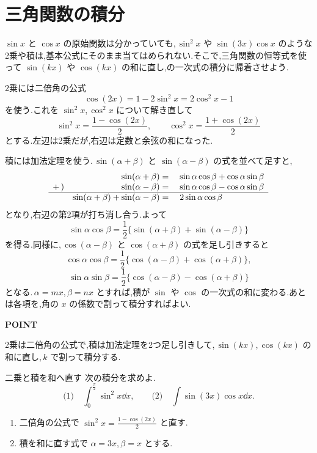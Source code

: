 \section{三角関数の積分}\label{節:三角式の整理}

$\sin x$ と $\cos x$ の原始関数は分かっていても,\,$\sin^2x$ や $\sin(3x)\cos x$ のような2乗や積は,基本公式にそのまま当てはめられない.そこで,三角関数の恒等式を使って $\sin(kx)$ や $\cos(kx)$ の和に直し,の一次式の積分に帰着させよう.

2乗には二倍角の公式
\[
 \cos(2x)=1-2\sin^2x=2\cos^2x-1
\]
を使う.これを $\sin^2x$,\,$\cos^2x$ について解き直して
\[
 \sin^2x=\frac{1-\cos(2x)}2,\qquad
 \cos^2x=\frac{1+\cos(2x)}2
\]
とする.左辺は2乗だが,右辺は定数と余弦の和になった.

積には加法定理を使う.\,$\sin(\alpha+\beta)$ と $\sin(\alpha-\beta)$ の式を並べて足すと,
\[
 \begin{array}{rrl}
  &\sin(\alpha+\beta)={}&\sin\alpha\cos\beta+\cos\alpha\sin\beta\\
  +\,)&\sin(\alpha-\beta)={}&\sin\alpha\cos\beta-\cos\alpha\sin\beta\\ \hline
  &\sin(\alpha+\beta)+\sin(\alpha-\beta)={}&2\sin\alpha\cos\beta
 \end{array}
\]
となり,右辺の第2項が打ち消し合う.よって
\[
 \sin\alpha\cos\beta=\frac12\{\sin(\alpha+\beta)+\sin(\alpha-\beta)\}
\]
を得る.同様に,\,$\cos(\alpha-\beta)$ と $\cos(\alpha+\beta)$ の式を足し引きすると
\[
 \cos\alpha\cos\beta=\frac12\{\cos(\alpha-\beta)+\cos(\alpha+\beta)\},
\]
\[
 \sin\alpha\sin\beta=\frac12\{\cos(\alpha-\beta)-\cos(\alpha+\beta)\}
\]
となる.\,$\alpha=mx$,\,$\beta=nx$ とすれば,積が $\sin$ や $\cos$ の一次式の和に変わる.あとは各項を,角の $x$ の係数で割って積分すればよい.

\begin{bookpoint}
\textbf{POINT}\par
2乗は二倍角の公式で,積は加法定理を2つ足し引きして,\,$\sin(kx)$,\,$\cos(kx)$ の和に直し,\,$k$ で割って積分する.
\end{bookpoint}

\begin{example}{二乗と積を和へ直す}
次の積分を求めよ.
\[
 \text{(1)}\quad\int_0^{\frac\pi2}\sin^2x\dd x,
 \qquad
 \text{(2)}\quad\int\sin(3x)\cos x\dd x.
\]
\end{example}

\begin{enumerate}[label=(\arabic*)]
 \item 二倍角の公式で $\sin^2x=\frac{1-\cos(2x)}2$ と直す.
 \item 積を和に直す式で $\alpha=3x$,\,$\beta=x$ とする.
\end{enumerate}

